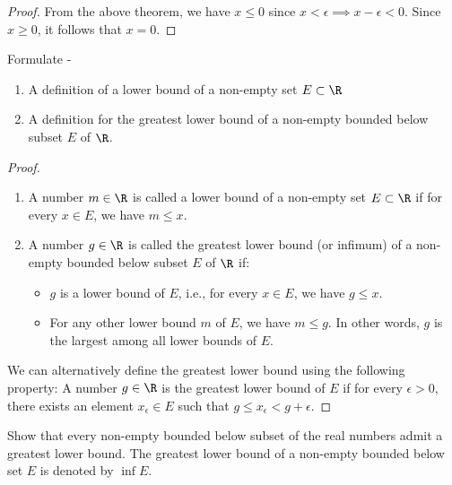 \documentclass[openany]{book}
\begin{document}
\begin{proof}
    From the above theorem, we have $x \leq 0$ since $x < \epsilon \implies x - \epsilon < 0$. Since $x \geq 0$, it follows that $x = 0$.
\end{proof}
\begin{exercise}
Formulate -
\begin{enumerate}
    \item A definition of a lower bound of a non-empty set $E \subset \R$
    \item A definition for the greatest lower bound of a non-empty bounded below subset $E$ of $\R$.
\end{enumerate}
\end{exercise}
\begin{proof}
    \begin{enumerate}
        \item A number $m \in \R$ is called a lower bound of a non-empty set $E \subset \R$ if for every $x \in E$, we have $m \leq x$.
        \item A number $g \in \R$ is called the greatest lower bound (or infimum) of a non-empty bounded below subset $E$ of $\R$ if:
        \begin{itemize}
            \item $g$ is a lower bound of $E$, i.e., for every $x \in E$, we have $g \leq x$.
            \item For any other lower bound $m$ of $E$, we have $m \leq g$. In other words, $g$ is the largest among all lower bounds of $E$.
        \end{itemize}
    \end{enumerate}
We can alternatively define the greatest lower bound using the following property: A number $g \in \R$ is the greatest lower bound of $E$ if for every $\epsilon > 0$, there exists an element $x_\epsilon \in E$ such that $g \leq x_\epsilon < g + \epsilon$.
\end{proof}
\begin{exercise}
Show that every non-empty bounded below subset of the real numbers admit
a greatest lower bound. The greatest lower bound of a non-empty bounded below set $E$ is denoted by $\inf E$.
\end{exercise}
\end{document}
